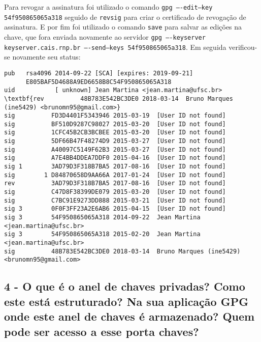 \documentclass[
    article,            %
    11pt,               %
    oneside,            %
    a4paper,            %
    english,            %
    brazil,             %
    sumario=tradicional,
    ]{abntex2}
\begin{document}
Para revogar a assinatura foi utilizado o comando \texttt{gpg ----edit--key 54f950865065a318} seguido de \texttt{revsig} para criar o certificado de revogação de assinatura. E por fim foi utilizado o comando \texttt{save} para salvar as edições na chave, que fora enviada novamente ao servidor \texttt{gpg ----keyserver keyserver.cais.rnp.br ----send--keys 54f950865065a318}. Em seguida verificou-se novamente seu status:

\begin{Verbatim}[frame=single, commandchars=\\\{\}, fontsize=\footnotesize]
pub   rsa4096 2014-09-22 [SCA] [expires: 2019-09-21]
      E805BAF5D4688A9ED6658B8C54F950865065A318
uid           [ unknown] Jean Martina <jean.martina@ufsc.br>
\textbf{rev          48B783E542BC3DE0 2018-03-14  Bruno Marques (ine5429) <brunomn95@gmail.com>}
sig          FD3D4401F5343946 2015-03-19  [User ID not found]
sig          BF510D9287C98027 2015-03-20  [User ID not found]
sig          1CFC45B2CB3BCBEE 2015-03-20  [User ID not found]
sig          5DF66B47F48274D9 2015-03-27  [User ID not found]
sig          A40097C5149F62B3 2015-03-27  [User ID not found]
sig          A7E4BB4DDEA7DDF0 2015-04-16  [User ID not found]
sig 1        3AD79D3F318B7BA5 2017-08-16  [User ID not found]
sig        1 D84870658D9AA66A 2017-01-24  [User ID not found]
rev          3AD79D3F318B7BA5 2017-08-16  [User ID not found]
sig          C47D8F38399DE079 2015-03-20  [User ID not found]
sig          C7BC91E9273DD888 2015-03-21  [User ID not found]
sig 3        0F0F3FF23A2E6AB6 2015-04-15  [User ID not found]
sig 3        54F950865065A318 2014-09-22  Jean Martina <jean.martina@ufsc.br>
sig 3        54F950865065A318 2015-02-20  Jean Martina <jean.martina@ufsc.br>
sig          48B783E542BC3DE0 2018-03-14  Bruno Marques (ine5429) <brunomn95@gmail.com>
\end{Verbatim}



\subsection*{\textbf{4 - O que é o anel de chaves privadas? Como este está estruturado? Na sua aplicação GPG onde este anel de chaves é armazenado? Quem pode ser acesso a esse porta chaves?}}
\end{document}
